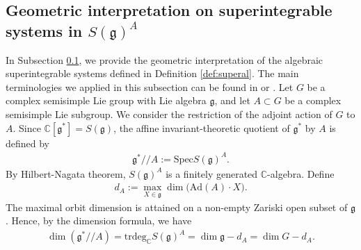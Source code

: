 \documentclass[11pt,reqno]{amsart}
\newtheorem*{theorem A}{Main Theorem A}
\newtheorem*{theorem B}{Main Theorem B}
\newtheorem*{theorem C}{Main Theorem C}
\newtheorem*{theorem D}{Main Theorem D}
\theoremstyle{definition}
\theoremstyle{plain}
\theoremstyle{conclusion}
\begin{document}
 


\subsection{Geometric interpretation on superintegrable systems in \texorpdfstring{$S(\mathfrak{g})^A$}{S()\^{}A}}
\label{subsec:geomi}
In Subsection \ref{subsec:geomi}, we provide the geometric interpretation of the algebraic superintegrable systems defined in Definition \ref{def:superal}. The main terminologies we applied in this subsection can be found in \cite[Chapter 6]{Dolgachev03} or \cite{Brion2010Actions}. Let $G$ be a complex semisimple Lie group with Lie algebra $\mathfrak{g}$, and let $A\subset G$ be a complex semisimple Lie subgroup. We consider the restriction of the adjoint action of $G$ to $A$. Since $\mathbb{C} [\mathfrak{g}^*]=S(\mathfrak{g})$, the affine invariant-theoretic quotient of $\mathfrak{g}^*$ by $A$ is defined by \begin{align} 
\mathfrak{g}^*//A:=\mathrm{Spec}S(\mathfrak{g})^A.  \label{eq:gitquotient} 
\end{align} By  Hilbert-Nagata theorem, $S(\mathfrak{g})^A$ is a finitely generated $\mathbb{C} $-algebra. Define \begin{align*} 
d_A:=\max_{X\in\mathfrak{g}}\dim\bigl(\mathrm{Ad}(A)\cdot X\bigr). 
\end{align*} The maximal orbit dimension is attained on a non-empty Zariski open subset of $\mathfrak{g}$. Hence, by the dimension formula, we have \begin{align} 
\dim(\mathfrak{g}^*//A) =\mathrm{trdeg}_{\mathbb{C}}S(\mathfrak{g})^A = \dim \mathfrak{g} -d_A = \dim G -d_A.  \label{eq:dimgitquo} 
\end{align}
\end{document}
